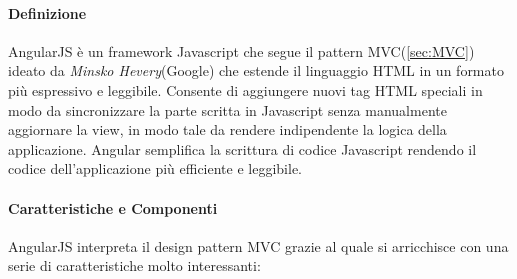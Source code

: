 \paragraph{Definizione}
AngularJS è un framework Javascript che segue il pattern MVC(\ref{sec:MVC}) ideato da \emph{Minsko Hevery}(Google) che estende il linguaggio HTML in un formato più espressivo e leggibile. Consente di aggiungere nuovi tag HTML speciali in modo da sincronizzare la parte scritta in Javascript senza manualmente aggiornare la view, in modo tale da rendere indipendente la logica della applicazione. Angular semplifica la scrittura di codice Javascript rendendo il codice dell'applicazione più efficiente e leggibile.
\paragraph{Caratteristiche e Componenti}
AngularJS interpreta il design pattern MVC grazie al quale si arricchisce con una serie di caratteristiche molto interessanti:
